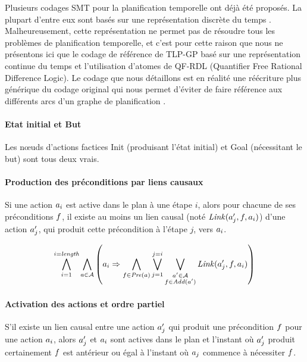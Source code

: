 %
%

Plusieurs codages SMT pour la planification temporelle ont déjà été proposés. La plupart d'entre eux sont basés sur une représentation discrète du temps \cite{DBLP:journals/ai/ShinD05,DBLP:conf/aaai/Rintanen15}. Malheureusement, cette représentation ne permet pas de résoudre tous les problèmes de planification temporelle, et c'est pour cette raison que nous ne présentons ici que le codage de référence de TLP-GP \cite{DBLP:conf/ictai/MarisR08} basé sur une représentation continue du temps et l'utilisation d'atomes de QF-RDL (Quantifier Free Rational Difference Logic). Le codage que nous détaillons est en réalité une réécriture plus générique du codage original qui nous permet d'éviter de faire référence aux différents arcs d'un graphe de planification \cite{BF95,BF97}.

\paragraph{Etat initial et But}

Les nœuds d'actions factices Init (produisant l'état initial) et Goal (nécessitant le but) sont tous deux vrais.

\paragraph{Production des préconditions par liens causaux}

Si une action $a_{i}$ est active dans le plan à une étape $i$, alors pour chacune de ses préconditions $f$, il existe au moins un lien causal (noté $\mathit{Link}(a'_{j},f,a_{i})$) d'une action $a'_{j}$, qui produit cette précondition à l'étape $j$, vers $a_{i}$.

\[ \bigwedge\limits_{\substack{i=1}}^{i=\textit{length}} \bigwedge\limits_{\substack{a\in\mathcal{A}}} \left( a_{i} \Rightarrow \bigwedge\limits_{\substack{f\in\mathit{Pre}(a)}} \bigvee\limits_{\substack{j=1}}^{j=i}\bigvee\limits_{\substack{a'\in\mathcal{A}\\f\in\mathit{Add}(a')}} \mathit{Link}(a'_{j},f,a_{i}) \right)
\]

\paragraph{Activation des actions et ordre partiel}

S’il existe un lien causal entre une action $a'_{j}$ qui produit une précondition $f$ pour une action $a_{i}$, alors $a'_{j}$ et $a_{i}$ sont actives dans le plan et l’instant où $a'_{j}$ produit certainement $f$ est antérieur ou égal à l’instant où $a_{j}$ commence à nécessiter $f$.

